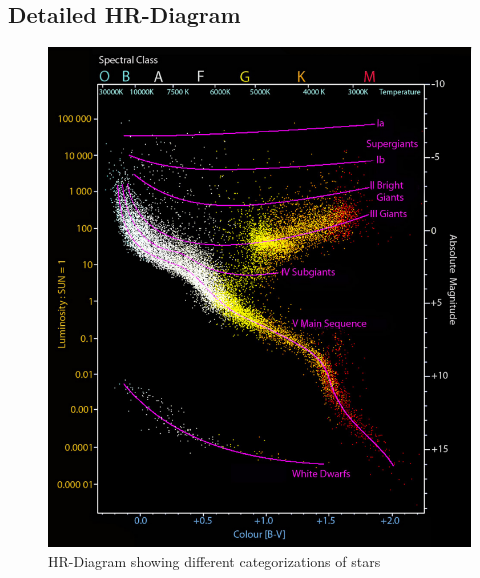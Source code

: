 \documentclass[reprint,english,notitlepage]{revtex4-2}
\begin{document}
\subsection{Detailed HR-Diagram}
\begin{figure}[h!]
  \centering
  \includegraphics[scale = .75]{figures/Spectral_class}
  \caption{HR-Diagram showing different categorizations of stars%
  }
  \label{fig: Spectral class}
\end{figure}
\clearpage
\twocolumngrid

\newpage
\end{document}
